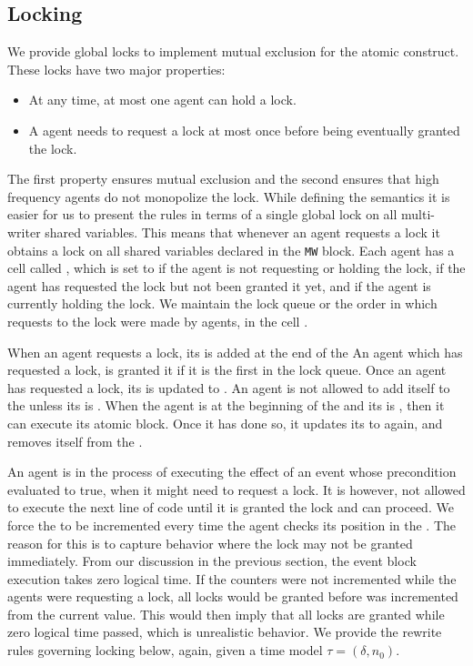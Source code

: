 \subsection[h]{Locking}
\label{sect:locking}
We provide global locks to implement mutual exclusion for the atomic construct. 
	These locks have two major properties:
    \begin{itemize}
\item At any time, at most one agent can hold a lock. 
\item A agent needs to request a lock at most once before being eventually granted the lock. 
\end{itemize}
The first property ensures mutual exclusion and the second ensures that high frequency agents do not monopolize the lock. 
While defining the semantics it is easier for us to present the rules in terms of a single global lock on all multi-writer shared variables. This means that whenever an agent requests a lock it obtains a lock on all shared variables declared in the \verb|MW| block. Each agent has a cell called , which is set to  if the agent is not requesting or holding the lock,  if the agent has requested the lock but not been granted it yet, and  if the agent is currently holding the lock. We maintain the lock queue or the order in which requests to the lock were made by agents, in the cell . 

When an agent requests a lock, its  is added at the end of the  An agent which has requested a lock, is granted it if it is the first in the lock queue. Once an agent has requested a lock, its  is updated to . An agent is not allowed to add itself to the  unless its  is . When the agent is at the beginning of the  and its  is , then it can execute its atomic block. Once it has done so, it updates its  to  again, and removes itself from the . 

An agent is in the process of executing the effect of an event whose precondition evaluated to true, when it might need to request a lock. It is however, not allowed to execute the next line of code until it is granted the lock and can proceed. We force the  to be incremented every time the agent checks its position in the . The reason for this is to capture behavior where the lock may not be granted immediately. From our discussion in the previous section, the event block execution takes zero logical time. If the counters were not incremented while the agents were requesting a lock, all locks would be granted before  was incremented from the current value. This would then imply that all locks are granted while zero logical time passed, which is unrealistic behavior. We provide the rewrite rules governing locking below, again, given a time model $\tau = (\delta,n_0)$. 

